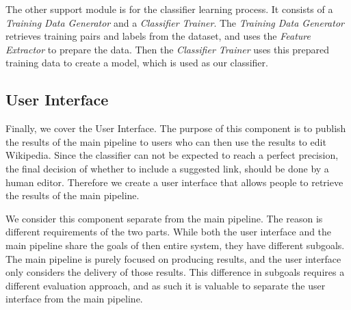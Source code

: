 The other support module is for the classifier learning process. It consists of a \emph{Training Data Generator} and a \emph{Classifier Trainer}. The \emph{Training Data Generator} retrieves training pairs and labels from the dataset, and uses the \emph{Feature Extractor} to prepare the data. Then the \emph{Classifier Trainer} uses this prepared training data to create a model, which is used as our classifier.

\subsection{User Interface}

Finally, we cover the User Interface. The purpose of this component is to publish the results of the main pipeline to users who can then use the results to edit Wikipedia. Since the classifier can not be expected to reach a perfect precision, the final decision of whether to include a suggested link, should be done by a human editor. Therefore we create a user interface that allows people to retrieve the results of the main pipeline.

We consider this component separate from the main pipeline. The reason is different requirements of the two parts. While both the user interface and the main pipeline share the goals of then entire system, they have different subgoals. The main pipeline is purely focused on producing results, and the user interface only considers the delivery of those results. This difference in subgoals requires a different evaluation approach, and as such it is valuable to separate the user interface from the main pipeline.










